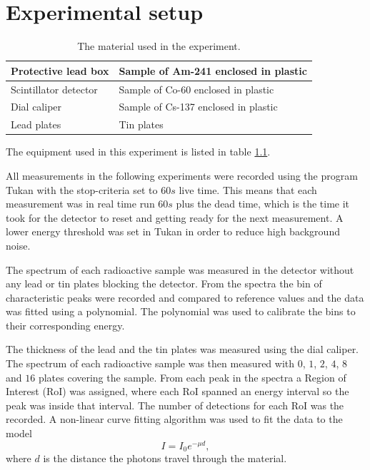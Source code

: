 \documentclass[12pt]{report}
\begin{document}
\chapter{Experimental setup}
\begin{table}[ht]
    \centering
    \begin{tabular}{|l|l|}
     \hline
        Protective lead box     & Sample of Am-241 enclosed in plastic \\ \hline
        Scintillator detector   & Sample of Co-60 enclosed in plastic \\ \hline
        Dial caliper            & Sample of Cs-137 enclosed in plastic \\ \hline
        Lead plates             & Tin plates \\ \hline
    \end{tabular}
    \caption{The material used in the experiment.}
    \label{tab:material}
\end{table}

The equipment used in this experiment is listed in table \ref{tab:material}.

All measurements in the following experiments were recorded using the program Tukan with the stop-criteria set to $60s$ live time. This means that each measurement was in real time run $60s$ plus the dead time, which is the time it took for the detector to reset and getting ready for the next measurement. A lower energy threshold was set in Tukan in order to reduce high background noise.

The spectrum of each radioactive sample was measured in the detector without any lead or tin plates blocking the detector. From the spectra the bin of characteristic peaks were recorded and compared to reference values \cite{nudat} and the data was fitted using a polynomial. The polynomial was used to calibrate the bins to their corresponding energy.

The thickness of the lead and the tin plates was measured using the dial caliper. The spectrum of each radioactive sample was then measured with $0$, $1$, $2$, $4$, $8$ and $16$ plates covering the sample. From each peak in the spectra a Region of Interest (RoI) was assigned, where each RoI spanned an energy interval so the peak was inside that interval. The number of detections for each RoI was the recorded. A non-linear curve fitting algorithm was used to fit the data to the model
\begin{equation}
    I = I_0 e^{-\mu d},
\end{equation}
where $d$ is the distance the photons travel through the material.
\end{document}
